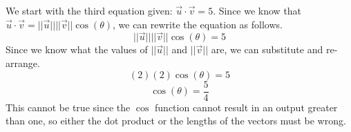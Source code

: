 \documentclass{article}
\begin{document}
We start with the third equation given: $\vec{u}\cdot\vec{v}=5$. Since we know that $\vec{u}\cdot\vec{v}=||\vec{u}||||\vec{v}||\cos(\theta)$, we can rewrite the equation as follows.
\[||\vec{u}||||\vec{v}||\cos(\theta)=5\]
Since we know what the values of $||\vec{u}||$ and $||\vec{v}||$ are, we can substitute and re-arrange.
\[(2)(2)\cos(\theta)=5\]
\[\cos(\theta)=\frac{5}{4}\]
This cannot be true since the $\cos$ function cannot result in an output greater than one, so either the dot product or the lengths of the vectors must be wrong.
\end{document}
